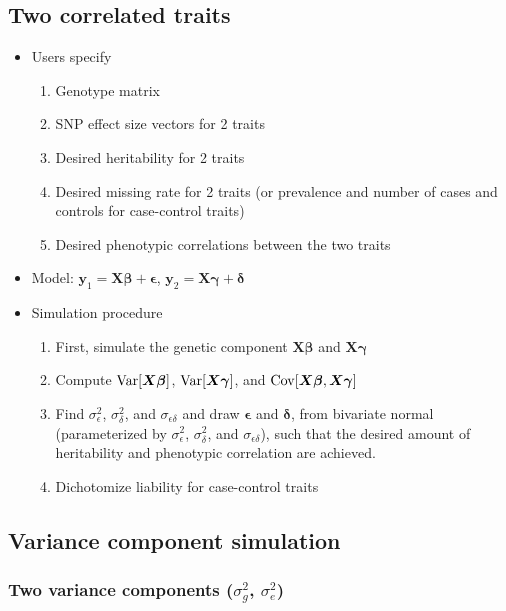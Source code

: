 \documentclass[12pt]{article}
\def\Var{\mathop{\rm Var}\nolimits}
\def\Cov{\mathop{\rm Cov}\nolimits}
\newcommand{\by}{\boldsymbol{y}}
\newcommand{\bX}{\boldsymbol{X}}
\newcommand{\bbeta}{\boldsymbol{\beta}}
\newcommand{\bgamma}{\boldsymbol{\gamma}}
\newcommand{\bdelta}{\boldsymbol{\delta}}
\newcommand{\bepsilon}{\boldsymbol{\epsilon}}
\begin{document}
\begin{spacing}{1.0}
\subsection{Two correlated traits}
\begin{itemize}
    \item Users specify
        \begin{enumerate}
            \item Genotype matrix
            \item SNP effect size vectors for 2 traits
            \item Desired heritability for 2 traits
            \item Desired missing rate for 2 traits (or prevalence and number of cases and
                  controls for case-control traits)
            \item Desired phenotypic correlations between the two traits
        \end{enumerate}
    \item Model: $\by_1 = \bX \bbeta + \bepsilon$, $\by_2 = \bX \bgamma + \bdelta$
    \item Simulation procedure
    \begin{enumerate}
        \item First, simulate the genetic component $\bX\bbeta$ and $\bX\bgamma$
        \item Compute $\Var[\bX\bbeta]$, $\Var[\bX\bgamma]$, and $\Cov[\bX\bbeta, \bX\bgamma]$
        \item Find $\sigma^2_\epsilon$, $\sigma^2_\delta$, and $\sigma_{\epsilon\delta}$
              and draw $\bepsilon$ and $\bdelta$, from bivariate normal (parameterized by
              $\sigma^2_\epsilon$, $\sigma^2_\delta$, and $\sigma_{\epsilon\delta}$),
              such that the desired amount of heritability and phenotypic correlation are achieved.
        \item Dichotomize liability for case-control traits
    \end{enumerate}
\end{itemize}

\subsection{Variance component simulation}

\subsubsection{Two variance components ($\sigma^2_g$, $\sigma^2_e$)}


\end{spacing}
\end{document}
